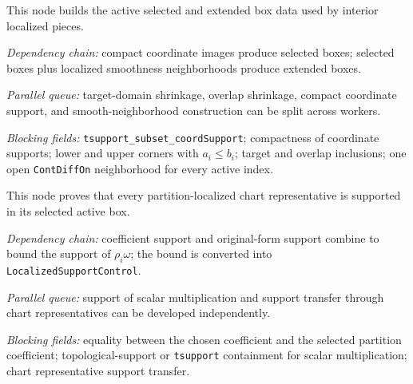 \begin{definition}
  \label{obl:m7_compact_support_active_boxes}
  This node builds the active selected and extended box data used by interior
  localized pieces.

  \emph{Dependency chain:}
  compact coordinate images produce selected boxes; selected boxes plus
  localized smoothness neighborhoods produce extended boxes.

  \emph{Parallel queue:}
  target-domain shrinkage, overlap shrinkage, compact coordinate support, and
  smooth-neighborhood construction can be split across workers.

  \emph{Blocking fields:}
  \texttt{tsupport\_subset\_coordSupport}; compactness of coordinate supports;
  lower and upper corners with \(a_i \le b_i\); target and overlap inclusions;
  one open \texttt{ContDiffOn} neighborhood for every active index.
\end{definition}

\begin{lemma}
  \label{obl:m7_localized_support_controls}
  This node proves that every partition-localized chart representative is
  supported in its selected active box.

  \emph{Dependency chain:}
  coefficient support and original-form support combine to bound the support of
  \(\rho_i\omega\); the bound is converted into
  \texttt{LocalizedSupportControl}.

  \emph{Parallel queue:}
  support of scalar multiplication and support transfer through chart
  representatives can be developed independently.

  \emph{Blocking fields:}
  equality between the chosen coefficient and the selected partition
  coefficient; topological-support or \texttt{tsupport} containment for scalar
  multiplication; chart representative support transfer.
\end{lemma}

